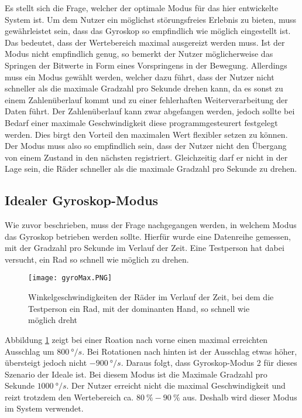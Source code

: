 Es stellt sich die Frage, welcher der optimale Modus für das hier entwickelte System ist.
Um dem Nutzer ein möglichst störungsfreies Erlebnis zu bieten, muss gewährleistet sein, dass das Gyroskop so empfindlich wie möglich eingestellt ist.
Das bedeutet, dass der Wertebereich maximal ausgereizt werden muss.
Ist der Modus nicht empfindlich genug, so bemerkt der Nutzer möglicherweise das Springen der Bitwerte in Form eines Vorspringens in der Bewegung.
Allerdings muss ein Modus gewählt werden, welcher dazu führt, dass der Nutzer nicht schneller als die maximale Gradzahl pro Sekunde drehen kann, da es sonst zu einem Zahlenüberlauf kommt und zu einer fehlerhaften Weiterverarbeitung der Daten führt.
Der Zahlenüberlauf kann zwar abgefangen werden, jedoch sollte bei Bedarf einer maximale Geschwindigkeit diese programmgesteurert festgelegt werden.
Dies birgt den Vorteil den maximalen Wert flexibler setzen zu können.
Der Modus muss also so empfindlich sein, dass der Nutzer nicht den Übergang von einem Zustand in den nächsten registriert.
Gleichzeitig darf er nicht in der Lage sein, die Räder schneller als die maximale Gradzahl pro Sekunde zu drehen.

\subsection{Idealer Gyroskop-Modus}
Wie zuvor beschrieben, muss der Frage nachgegangen werden, in welchem Modus das Gyroskop betrieben werden sollte.
Hierfür wurde eine Datenreihe gemessen, mit der Gradzahl pro Sekunde im Verlauf der Zeit.
Eine Testperson hat dabei versucht, ein Rad so schnell wie möglich zu drehen.

\begin{figure}[h]
    \centering
    \texttt{[image: gyroMax.PNG]}
    \caption{Winkelgeschwindigkeiten der Räder im Verlauf der Zeit, bei dem die Testperson ein Rad, mit der dominanten Hand, so schnell wie möglich dreht}
    \label{fig:gyroMax}
\end{figure}

Abbildung \ref{fig:gyroMax} zeigt bei einer Roation nach vorne einen maximal erreichten Ausschlag um $800\ \si{\degree}/s$.
Bei Rotationen nach hinten ist der Ausschlag etwas höher, übersteigt jedoch nicht $-900\ \si{\degree}/s$.
Daraus folgt, dass Gyroskop-Modus 2 für dieses Szenario der Ideale ist.
Bei diesem Modus ist die Maximale Gradzahl pro Sekunde $1000\ \si{\degree}/s$.
Der Nutzer erreicht nicht die maximal Geschwindigkeit und reizt trotzdem den Wertebereich ca. $80\ \%-90\ \%$ aus. Deshalb wird dieser Modus im System verwendet.

